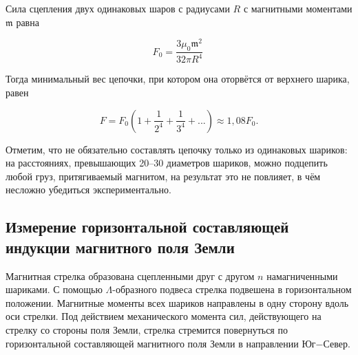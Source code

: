 \documentclass[a4paper,12pt]{article} %
\begin{document}
\hfill \break Сила сцепления двух одинаковых шаров с радиусами $R$ с магнитными моментами $\mathfrak{m}$ равна 

\begin{equation*}
        F_0 = \frac{3 \mu_0 \mathfrak{m}^2}{32 \pi R^4}\    
\end{equation*}

\hfill \break
Тогда минимальный вес цепочки, при котором она оторвётся от верхнего шарика, равен

\begin{equation*}
    F = F_0\left(1 + \frac{1}{2^4} + \frac{1}{3^4} + ... \right) \approx 1,08F_0.
\end{equation*}

\hfill \break
Отметим, что не обязательно составлять цепочку только из одинаковых шариков: на расстояниях, превышающих 20–30 диаметров шариков, можно подцепить любой груз, притягиваемый магнитом, на результат это не повлияет, в чём несложно убедиться экспериментально.

\subsection{Измерение горизонтальной составляющей индукции магнитного поля Земли}

\hfill \break Магнитная стрелка образована сцепленными друг с другом $n$ намагниченными шариками. С помощью $\Lambda$-образного подвеса стрелка подвешена в горизонтальном положении. Магнитные моменты всех шариков направлены в одну сторону вдоль оси стрелки. Под действием механического момента сил, действующего на стрелку со стороны поля Земли, стрелка стремится повернуться по горизонтальной составляющей магнитного поля Земли в направлении Юг$-$Север.
\end{document}
